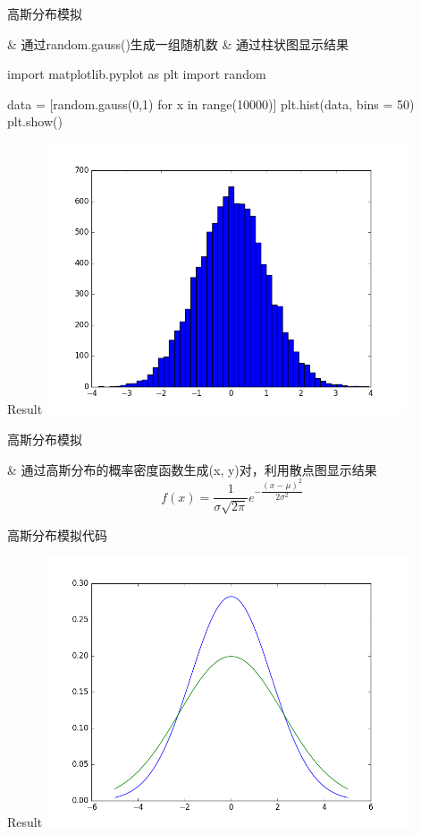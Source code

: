 \begin{frame}[fragile]{高斯分布模拟}
  \begin{easylist}
    & 通过random.gauss()生成一组随机数
    & 通过柱状图显示结果
  \end{easylist}
  \pause
  \begin{python}
    import matplotlib.pyplot as plt
    import random

    data = [random.gauss(0,1) for x in range(10000)]
    plt.hist(data, bins = 50)
    plt.show()
  \end{python}
\end{frame}

\begin{frame}[fragile]{Result}
  \includegraphics[width=0.8\textwidth]{figure/gauss1.png}
\end{frame}


\begin{frame}[fragile]{高斯分布模拟}
  \begin{easylist}
    & 通过高斯分布的概率密度函数生成(x, y)对，利用散点图显示结果
    \[ f(x) = \dfrac{1}{\sigma \sqrt{2 \pi}} e^{-\dfrac{(x-\mu)^2}{2 \sigma^2}} \]
  \end{easylist}
\end{frame}

\begin{frame}[fragile]{高斯分布模拟代码}
  
\end{frame}

\begin{frame}[fragile]{Result}
  \includegraphics[width=0.8\textwidth]{figure/gauss2.png}
\end{frame}


